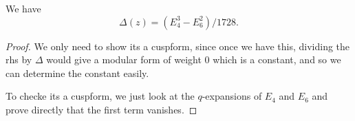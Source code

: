 \begin{lemma}\label{lemma:disc-E4E6}
We have
\begin{equation}
\Delta(z) = (E_4^3-E_6^2)/1728.
\end{equation}
\end{lemma}
\begin{proof}
We only need to show its a cuspform, since once we have this, dividing the rhs by $\Delta$ would give a modular form of weight $0$ which is a constant, and so we can determine the constant easily.

To checke its a cuspform, we just look at  the $q$-expansions of $E_4$ and $E_6$ and prove directly that the first term vanishes.

\end{proof}

